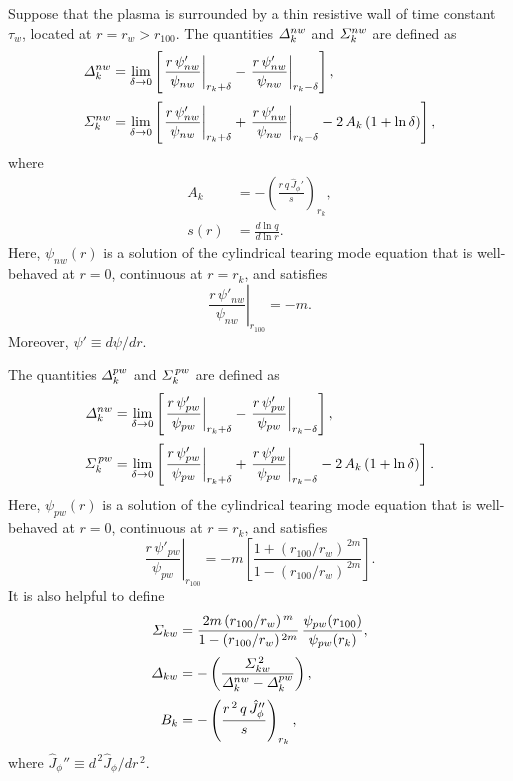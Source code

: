 \documentclass[notitlepage,12pt]{article}
\begin{document}
Suppose that the plasma is surrounded by a thin resistive wall of time constant
$\tau_w$, located at $r=r_w>r_{100}$. The quantities ${\mit\Delta}_k^{nw}$ and ${\mit\Sigma}_k^{nw}$
are defined as 
\begin{align}
{\mit\Delta}_k^{nw}&= \lim_{\delta\rightarrow 0}
\left[\left.\frac{r\,\psi'_{nw}}{\psi_{nw}}\right|_{r_k+\delta}
- \left.\frac{r\,\psi'_{nw}}{\psi_{nw}}\right|_{r_k-\delta}\right],\\[0.5ex]
{\mit\Sigma}_k^{nw} &= \lim_{\delta\rightarrow 0}\left[\left.\frac{r\,\psi'_{nw}}{\psi_{nw}}\right|_{r_k+\delta}+ \left.\frac{r\,\psi'_{nw}}{\psi_{nw}}\right|_{r_k-\delta}
-2\,A_k\,(1+\ln\delta)\right],
\end{align}
where 
\begin{align}
A_k &= -\left(\frac{r\,q\,\hat{J}_\phi'}{s}\right)_{r_k},\\[0.5ex]
s(r) &= \frac{d\ln q}{d\ln r}.
\end{align}
Here, $\psi_{nw}(r)$ is a solution of the cylindrical tearing mode equation that is well-behaved at $r=0$,
continuous at $r=r_k$, and satisfies 
\begin{equation}
\left.\frac{r\,\psi'_{nw}}{\psi_{nw}}\right|_{r_{100}} = -m.
\end{equation}
 Moreover, $\psi'\equiv d\psi/dr$. 

The quantities ${\mit\Delta}_k^{pw}$ and ${\mit\Sigma}_k^{\,pw}$
are defined as 
\begin{align}
{\mit\Delta}_k^{nw}&= \lim_{\delta\rightarrow 0}
\left[\left.\frac{r\,\psi'_{pw}}{\psi_{pw}}\right|_{r_k+\delta}
- \left.\frac{r\,\psi'_{pw}}{\psi_{pw}}\right|_{r_k-\delta}\right],\\[0.5ex]
{\mit\Sigma}_k^{\,pw} &= \lim_{\delta\rightarrow 0}\left[\left.\frac{r\,\psi'_{pw}}{\psi_{pw}}\right|_{r_k+\delta}+ \left.\frac{r\,\psi'_{pw}}{\psi_{pw}}\right|_{r_k-\delta}
-2\,A_k\,(1+\ln\delta)\right].
\end{align}
Here, $\psi_{pw}(r)$ is a solution of the cylindrical tearing mode equation that is well-behaved at $r=0$,
continuous at $r=r_k$, and satisfies 
\begin{equation}
\left.\frac{r\,\psi'_{pw}}{\psi_{pw}}\right|_{r_{100}} = -m\left[\frac{1+(r_{100}/r_w)^{\,2m}}{1-(r_{100}/r_w)^{\,2m}}\right].
\end{equation}
It is also helpful to define
\begin{align}
{\mit\Sigma}_{kw} &= \frac{2m\,(r_{100}/r_w)^{\,m}}{1-(r_{100}/r_w)^{\,2m}}\,\frac{\psi_{pw}(r_{100})}{\psi_{pw}(r_k)},\\[0.5ex]
{\mit\Delta}_{kw} &= -\left(\frac{{\mit\Sigma}_{kw}^{\,2}}{{\mit\Delta}^{nw}_k-{\mit\Delta}^{pw}_k}\right),\\[0.5ex]
B_k &= -\left(\frac{r^{\,2}\,q\,\hat{J}_\phi''}{s}\right)_{r_k},
\end{align}
where $\hat{J}_\phi'' \equiv d^{\,2}\hat{J}_\phi/dr^{\,2}$. 
\end{document}
